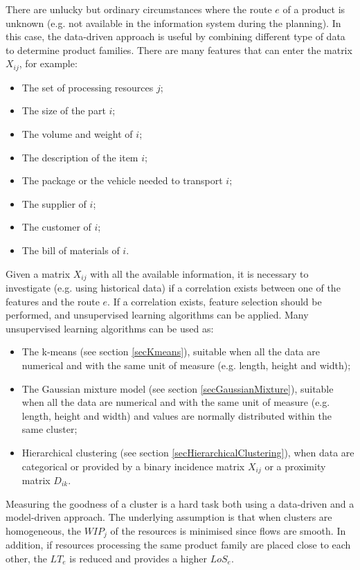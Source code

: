 There are unlucky but ordinary circumstances where the route $e$ of a product is unknown (e.g. not available in the information system during the planning). In this case, the data-driven approach is useful by combining different type of data to determine product families. There are many features that can enter the matrix $X_{ij}$, for example:

\begin{itemize}
    \item The set of processing resources $j$;
	\item The size of the part $i$;
	\item The volume and weight of $i$;
	\item The description of the item $i$;
	\item The package or the vehicle needed to transport $i$;
	\item The supplier of $i$;
	\item The customer of $i$;
	\item The bill of materials of $i$.

\end{itemize}

Given a matrix $X_{ij}$ with all the available information, it is necessary to investigate (e.g. using historical data) if a correlation exists between one of the features and the route $e$. If a correlation exists, feature selection should be performed, and unsupervised learning algorithms can be applied. Many unsupervised learning algorithms can be used as:

\begin{itemize}
    \item 	The k-means (see section \ref{secKmeans}), suitable when all the data are numerical and with the same unit of measure (e.g. length, height and width);
	\item The Gaussian mixture model (see section \ref{secGaussianMixture}), suitable when all the data are numerical and with the same unit of measure (e.g. length, height and width) and values are normally distributed within the same cluster;
	\item Hierarchical clustering (see section \ref{secHierarchicalClustering}), when data are categorical or provided by a binary incidence matrix $X_{ij}$ or a proximity matrix $D_{ik}$.

\end{itemize}

Measuring the goodness of a cluster is a hard task both using a data-driven and a model-driven approach. The underlying assumption is that when clusters are homogeneous, the $WIP_j$ of the resources is minimised since flows are smooth. In addition, if resources processing the same product family are placed close to each other, the $LT_e$ is reduced and provides a higher $LoS_e$.


